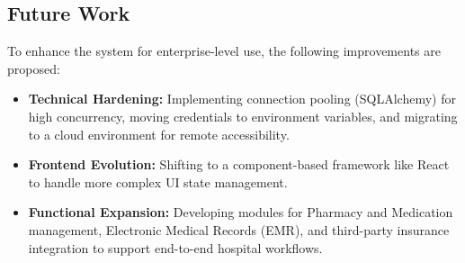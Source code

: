 \subsection{Future Work}

To enhance the system for enterprise-level use, the following improvements are proposed:
\begin{itemize}
    \item \textbf{Technical Hardening:} Implementing connection pooling (SQLAlchemy) for high concurrency, moving credentials to environment variables, and migrating to a cloud environment for remote accessibility.
    \item \textbf{Frontend Evolution:} Shifting to a component-based framework like React to handle more complex UI state management.
    \item \textbf{Functional Expansion:} Developing modules for Pharmacy and Medication management, Electronic Medical Records (EMR), and third-party insurance integration to support end-to-end hospital workflows.
\end{itemize}